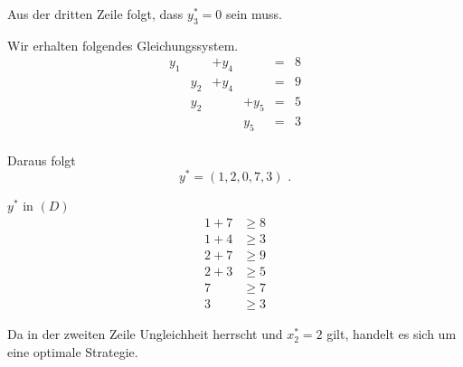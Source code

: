 \documentclass[a4paper]{scrartcl}
\begin{document}
\begin{enumerate}[label=\bfseries\arabic*.]
\begin{enumerate}
                Aus der dritten Zeile folgt, dass $y_3^* = 0$ sein muss.
                
                Wir erhalten folgendes Gleichungssystem.
                \begin{equation}
                    \begin{array}{rrrrcr}
                        y_1 & & +y_4 & & = & 8 \\
                        & y_2 & +y_4 & & = & 9 \\
                        & y_2 & & +y_5 & = & 5 \\
                        & & & y_5 & = & 3 \\
                    \end{array}
                \end{equation}

                Daraus folgt
                \begin{equation}
                    y^* = \left( 1, 2, 0, 7, 3 \right) \text{ .}
                \end{equation}
                
                $y^*$ in $(D)$
                \begin{equation}
                    \begin{split}
                        1 + 7 &\geq 8 \\
                        1 + 4 &\geq 3 \\
                        2 + 7 &\geq 9 \\
                        2 + 3 &\geq 5 \\
                        7 &\geq 7 \\
                        3 &\geq 3
                    \end{split}
                \end{equation}

                Da in der zweiten Zeile Ungleichheit herrscht und $x_2^* = 2$
                gilt, handelt es sich um eine optimale Strategie.
                

        \end{enumerate}

\end{enumerate}
\end{document}
